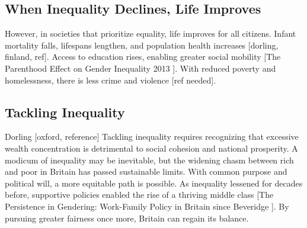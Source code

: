 \subsection{When Inequality Declines, Life Improves}

However, in societies that prioritize equality, life improves for all citizens. Infant mortality falls, lifespans lengthen, and population health increases [dorling, finland, ref]. Access to education rises, enabling greater social mobility [The Parenthood Effect on Gender Inequality 
2013 ]. With reduced poverty and homelessness, there is less crime and violence [ref needed].

\subsection{Tackling Inequality}

Dorling [oxford, reference] Tackling inequality requires recognizing that excessive wealth concentration is detrimental to social cohesion and national prosperity. A modicum of inequality may be inevitable, but the widening chasm between rich and poor in Britain has passed sustainable limits. With common purpose and political will, a more equitable path is possible. As inequality lessened for decades before, supportive policies enabled the rise of a thriving middle class [The Persistence in Gendering: Work-Family Policy in Britain since Beveridge 
]. By pursuing greater fairness once more, Britain can regain its balance.
